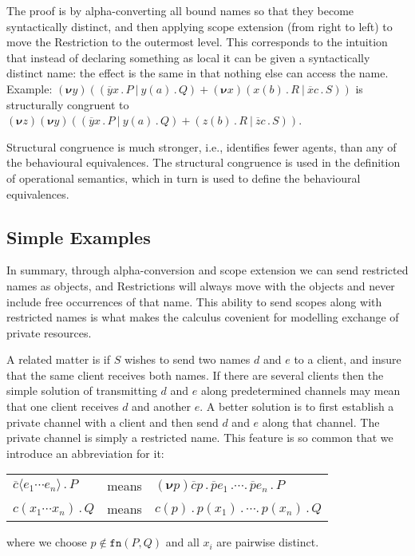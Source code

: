 \documentclass[10pt,a4paper]{article}
\newcommand{\resp}[1]{(\boldsymbol{\nu}#1)}
\newcommand{\res}[2]{\resp{#1}#2}
\newcommand{\outp}[2]{\overline{#1}#2}
\newcommand{\inpp}[2]{#1(#2)}
\newcommand{\prefix}[2]{{#1}\,.\,#2}
\newcommand{\out}[3]{\prefix{\outp{#1}{#2}}{#3}}
\newcommand{\inp}[3]{\prefix{\inpp{#1}{#2}}{#3}}
\newcommand{\para}{\:|\:}
\newcommand{\fn}{\texttt{fn}}
\begin{document}
The proof is by alpha-converting all bound names so that they become syntactically distinct, and then applying scope extension (from right to left) to move the Restriction to the outermost level. This corresponds to the intuition that instead of declaring something as local it can be given a syntactically distinct name: the effect is the same in that nothing else can access the name. Example: 
$\res{y}{((\out{y}{x}{P} \para \inp{y}{a}{Q}) + \res{x}{(\inp{x}{b}{R} \para \out{x}{c}{S}))}}$ is structurally congruent to $\res{z}{\res{y}{((\out{y}{x}{P} \para \inp{y}{a}{Q}) + (\inp{z}{b}{R} \para \out{z}{c}{S}))}}$.

Structural congruence is much stronger, i.e., identifies fewer agents, than any of the behavioural equivalences. The structural congruence is used in the definition of operational semantics, which in turn is used to define the behavioural equivalences.

\subsection{Simple Examples}

In summary, through alpha-conversion and scope extension we can send restricted names as objects, and Restrictions will always move with the objects and never include free occurrences of that name. This ability to send scopes along with restricted names is what makes the calculus covenient for modelling exchange of private resources.

A related matter is if $S$ wishes to send two names $d$ and $e$ to a client, and insure that the same client receives both names. If there are several clients then the simple solution of transmitting $d$ and $e$ along predetermined channels may mean that one client receives $d$ and another $e$. A better solution is to first establish a private channel with a client and then send $d$ and $e$ along that channel. The private channel is simply a restricted name. This feature is so common that we introduce an abbreviation for it:

\begin{center}
  \begin{tabular}{lll}
	$\out{c}{\langle e_1 \cdots e_n \rangle}{P}$ & means & $\res{p}{\outp{c}{p}\,.\,\outp{p}{e_1}\,. \cdots .\,\outp{p}{e_n}\,.\,P}$ \\
	$\inp{c}{x_1 \cdots x_n}{Q}$ & means & $\inpp{c}{p}\,.\,\inpp{p}{x_1}\,.\, \cdots .\,\inpp{p}{x_n}\,.\,Q$
  \end{tabular}
\end{center}
where we choose $p \notin \fn(P,Q)$ and all $x_i$ are pairwise distinct.
\end{document}

